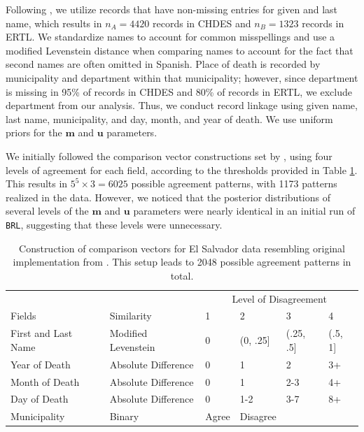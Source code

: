 \documentclass[ba]{imsart}
\begin{document}
	Following \cite{sadinle_bayesian_2017}, we utilize records that have non-missing entries for given and last name, which results in $n_A = 4420$ records in CHDES and $n_B = 1323$ records in ERTL. We standardize names to account for common misspellings and use a modified Levenstein distance when comparing names to account for the fact that second names are often omitted in Spanish. Place of death is recorded by municipality and department within that municipality; however, since department is missing in 95\% of records in CHDES and 80\% of records in ERTL, we exclude department from our analysis. Thus, we conduct record linkage using given name, last name, municipality, and day, month, and year of death. We use uniform priors for the $\bm{m}$ and $\bm{u}$ parameters.
	
	We initially followed the comparison vector constructions set by \cite{sadinle_bayesian_2017}, using four levels of agreement for each field, according to the thresholds provided in Table \ref{Tab:el_salvador_cutoffs_1}. This results in $5^5 \times 3 = 6025$ possible agreement patterns, with 1173 patterns realized in the data. However, we noticed that the posterior distributions of several levels of the $\bm{m}$ and $\bm{u}$ parameters were nearly identical in an initial run of \texttt{BRL}, suggesting that these levels were unnecessary.
	
	\begin{table}[t]
		\begin{tabular}[t]{llllll}
			\multicolumn{2}{c}{ } & \multicolumn{4}{c}{Level of Disagreement} \\
			\cline{3-6}
			Fields & Similarity & 1 & 2 & 3 & 4\\
			\hline
			First and Last Name & Modified Levenstein & 0 & (0, .25] & (.25, .5] & (.5, 1]\\
			Year of Death & Absolute Difference & 0 & 1 & 2 & 3+\\
			Month of Death & Absolute Difference & 0 & 1 & 2-3 & 4+\\
			Day of Death & Absolute Difference & 0 & 1-2 & 3-7 & 8+\\
			Municipality & Binary & Agree & Disagree &  & \\
			\hline
		\end{tabular}
		\caption{Construction of comparison vectors for El Salvador data resembling original implementation from \cite{sadinle_bayesian_2017}. This setup leads to 2048 possible agreement patterns in total.}\label{Tab:el_salvador_cutoffs_1}
	\end{table}
\end{document}
